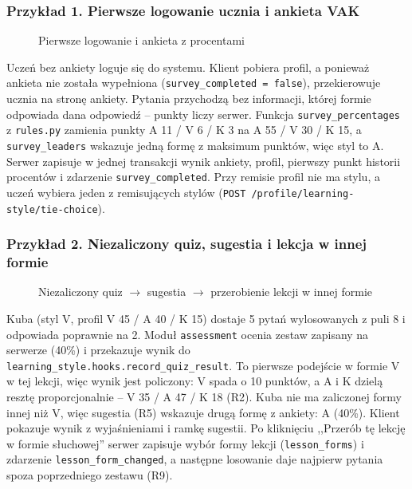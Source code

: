 \subsubsection{Przykład 1. Pierwsze logowanie ucznia i ankieta VAK}

\begin{figure}[H]
    \centering
    
    \caption{Pierwsze logowanie i ankieta z procentami}
\end{figure}

Uczeń bez ankiety loguje się do systemu. Klient pobiera profil, a ponieważ ankieta nie została wypełniona (\texttt{survey\_completed = false}), przekierowuje ucznia na stronę ankiety. Pytania przychodzą bez informacji, której formie odpowiada dana odpowiedź -- punkty liczy serwer. Funkcja \texttt{survey\_percentages} z \texttt{rules.py} zamienia punkty A 11 / V 6 / K 3 na A 55 / V 30 / K 15, a \texttt{survey\_leaders} wskazuje jedną formę z maksimum punktów, więc styl to A. Serwer zapisuje w jednej transakcji wynik ankiety, profil, pierwszy punkt historii procentów i zdarzenie \texttt{survey\_completed}. Przy remisie profil nie ma stylu, a uczeń wybiera jeden z remisujących stylów (\texttt{POST /profile/learning-style/tie-choice}).

\subsubsection{Przykład 2. Niezaliczony quiz, sugestia i lekcja w innej formie}

\begin{figure}[H]
    \centering
    
    \caption{Niezaliczony quiz $\to$ sugestia $\to$ przerobienie lekcji w innej formie}
\end{figure}

Kuba (styl V, profil V 45 / A 40 / K 15) dostaje 5 pytań wylosowanych z puli 8 i odpowiada poprawnie na 2. Moduł \texttt{assessment} ocenia zestaw zapisany na serwerze (40\%) i przekazuje wynik do \texttt{learning\_style.hooks.record\_quiz\_result}. To pierwsze podejście w formie V w tej lekcji, więc wynik jest policzony: V spada o 10 punktów, a A i K dzielą resztę proporcjonalnie -- V 35 / A 47 / K 18 (R2). Kuba nie ma zaliczonej formy innej niż V, więc sugestia (R5) wskazuje drugą formę z ankiety: A (40\%). Klient pokazuje wynik z wyjaśnieniami i ramkę sugestii. Po kliknięciu ,,Przerób tę lekcję w formie słuchowej'' serwer zapisuje wybór formy lekcji (\texttt{lesson\_forms}) i zdarzenie \texttt{lesson\_form\_changed}, a następne losowanie daje najpierw pytania spoza poprzedniego zestawu (R9).

